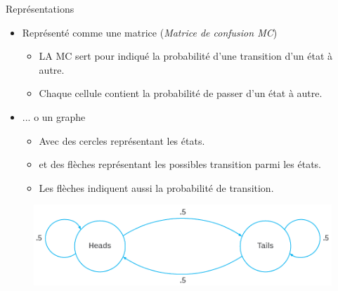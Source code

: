 \documentclass[aspectratio=169,xcolor=dvipsnames, t]{beamer}
\begin{document}
\begin{frame}{Représentations}
	\begin{itemize}
		\item Représenté comme une matrice (\textit{Matrice de confusion MC})
		\begin{itemize}
			\item LA MC sert pour indiqué la probabilité d'une transition d'un état à autre.
			\item Chaque cellule contient la probabilité de passer d'un état à autre.
		\end{itemize} 
		\item ... o un graphe
		\begin{itemize}
			\item Avec des cercles représentant les états.
			\item et des flèches représentant les possibles transition parmi les états.
			\item Les flèches indiquent aussi la probabilité de transition.
		\end{itemize} 
	\end{itemize}
	\begin{figure}
		\includegraphics[height=0.25\paperheight]{figures/markov_chain_coin_toss-f.png}
	\end{figure}
	
\end{frame}
\end{document}
